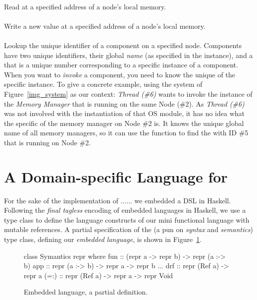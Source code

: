\paragraph{}
Read at a specified address of a node's local memory.
\paragraph{}
Write a new value at a specified address of a node's local memory.
\paragraph{}
Lookup the unique identifier of a component on a specified node.
Components have two unique identifiers, their global \emph{name} (as
specified in the  instance), and a  that
is a unique number corresponding to a specific instance of a
component.  When you want to \emph{invoke} a component, you need to
know the unique  of the specific instance.  To give a
concrete example, using the system of Figure~\ref{img_system} as our
context: \emph{Thread (\#6)} wants to invoke the instance of the
\emph{Memory Manager} that is running on the same Node (\#2).  As
\emph{Thread (\#6)} was not involved with the instantiation of that OS
module, it has no idea what the specific  of the
memory manager on Node \#2 is.  It knows the unique global name of all
memory managers, so it can use the  function to
find the  with ID \#5 that is running on Node \#2.

\section{A Domain-specific Language for \soosim}
\label{sec:dsl}

For the sake of the implementation of ...... we embedded a DSL in
Haskell. 
Following the \emph{final tagless} \cite{final_tagless_embedding}
encoding of embedded languages in Haskell, we use a type class to
define the language constructs of our mini functional language with
mutable references.  A partial specification of the  (a
pun on \emph{syntax} and \emph{semantics}) type class, defining our
\emph{embedded language}, is shown in
Figure~\ref{fig:embedded_language_interface}.

\begin{figure}
\centering
\begin{code}
class Symantics repr where
  fun  :: (repr a -> repr b) -> repr (a :-> b)
  app  :: repr (a :-> b) -> repr a -> repr b
  ...
  drf   :: repr (Ref a) -> repr a
  (=:)  :: repr (Ref a) -> repr a -> repr Void
\end{code}
\caption{Embedded language, a partial definition.}
\label{fig:embedded_language_interface}
\end{figure}

